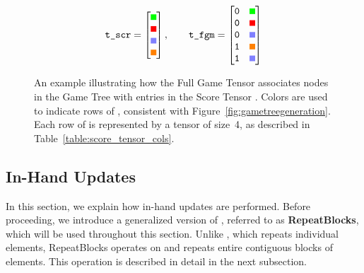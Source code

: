 \begin{figure}[h]
  \centering
\[
\py{t\_scr} = 
\begin{bmatrix}
\tikz\fill[green] (0,0) rectangle (0.2,0.2); \\
\tikz\fill[red] (0,0) rectangle (0.2,0.2); \\
\tikz\fill[fill=blue!50] (0,0) rectangle (0.2,0.2); \\
\tikz\fill[orange] (0,0) rectangle (0.2,0.2); \\
\end{bmatrix},
\qquad
\py{t\_fgm} = \begin{bmatrix}
\py{0} & \tikz\fill[green] (0,0) rectangle (0.2,0.2); \\
\py{0} & \tikz\fill[red] (0,0) rectangle (0.2,0.2); \\
\py{0} & \tikz\fill[fill=blue!50] (0,0) rectangle (0.2,0.2); \\
\py{1} & \tikz\fill[orange] (0,0) rectangle (0.2,0.2); \\
\py{1} & \tikz\fill[fill=blue!50] (0,0) rectangle (0.2,0.2); 
\end{bmatrix}
\]
\caption{An example illustrating how the Full Game Tensor  associates nodes in the Game Tree with entries in the Score Tensor . Colors are used to indicate rows of , consistent with Figure~\ref{fig:gametreegeneration}. Each row of  is represented by a tensor of size~4, as described in Table~\ref{table:score_tensor_cols}.}
  \label{fig:t_fgm_example}
\end{figure}

\subsection{In-Hand Updates}\label{sec:inhandupdates}
In this section, we explain how in-hand updates are performed. Before proceeding, we introduce a generalized version of , referred to as \textbf{RepeatBlocks}, which will be used throughout this section. Unlike , which repeats individual elements, RepeatBlocks operates on and repeats entire contiguous blocks of elements. This operation is described in detail in the next subsection.

